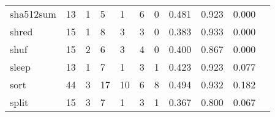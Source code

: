 \begin{longtable}{lp{1.20cm}p{1.20cm}p{1.20cm}p{1.20cm}p{1.20cm}p{1.20cm}p{1.20cm}p{1.20cm}p{1.20cm}p{1.20cm}}
sha512sum &                                    13 &                                                  1 &                                                  5 &                                                  1 &                                                  6 &                                                  0 &                                         0.481 &                                              0.923 &                                              0.000 \\
shred     &                                    15 &                                                  1 &                                                  8 &                                                  3 &                                                  3 &                                                  0 &                                         0.383 &                                              0.933 &                                              0.000 \\
shuf      &                                    15 &                                                  2 &                                                  6 &                                                  3 &                                                  4 &                                                  0 &                                         0.400 &                                              0.867 &                                              0.000 \\
sleep     &                                    13 &                                                  1 &                                                  7 &                                                  1 &                                                  3 &                                                  1 &                                         0.423 &                                              0.923 &                                              0.077 \\
sort      &                                    44 &                                                  3 &                                                 17 &                                                 10 &                                                  6 &                                                  8 &                                         0.494 &                                              0.932 &                                              0.182 \\
split     &                                    15 &                                                  3 &                                                  7 &                                                  1 &                                                  3 &                                                  1 &                                         0.367 &                                              0.800 &                                              0.067 \\

\end{longtable}
